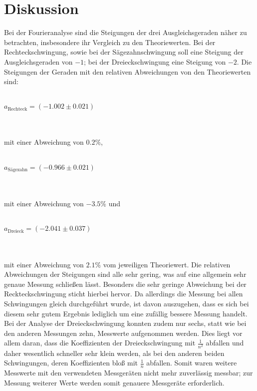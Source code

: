 \section{Diskussion}
\label{sec:Diskussion}
Bei der Fourieranalyse sind die Steigungen der drei Ausgleichsgeraden näher zu betrachten, insbesondere ihr Vergleich zu den 
Theoriewerten. Bei der Rechteckschwingung, sowie bei der Sägezahnschwingung soll eine Steigung der Ausgleichsgeraden von $-1$;
bei der Dreieckschwingung eine Steigung von $-2$. Die Steigungen der Geraden mit den relativen Abweichungen von den Theoriewerten 
sind: 
\\ \\
\centerline{$a_\text{Rechteck} = ( -1.002 \pm 0.021 ) $}
\\ \\
mit einer Abweichung von $0.2\%$,
\\ \\
\centerline{$ a_\text{Sägezahn} = (- 0.966 \pm 0.021)$}
\\ \\
mit einer Abweichung von $-3.5 \% $ und 
\\ \\
\centerline{$a_\text{Dreieck} = (-2.041 \pm 0.037 )$}
\\ \\
mit einer Abweichung von $2.1 \%$ vom  jeweiligen Theoriewert.
Die relativen Abweichungen der Steigungen sind alle sehr gering, was auf eine allgemein sehr genaue Messung schließen lässt.
Besonders die sehr geringe Abweichung bei der Reckteckschwingung sticht hierbei hervor. Da allerdings die Messung bei allen 
Schwingungen gleich durchgeführt wurde, ist davon auszugehen, dass es sich bei diesem sehr gutem Ergebnis lediglich um eine 
zufällig bessere Messung handelt. Bei der Analyse der Dreieckschwingung konnten zudem nur sechs, statt wie bei den anderen 
Messungen zehn, Messwerte aufgenommen werden. Dies liegt vor allem daran, dass die Koeffizienten der Dreieckschwingung mit 
$\frac{1}{n^2}$ abfallen und daher wesentlich schneller sehr klein werden, als bei den anderen beiden Schwingungen, deren 
Koeffizienten bloß mit $\frac{1}{n}$ abfallen. Somit waren weitere Messwerte mit den verwendeten Messgeräten nicht mehr 
zuverlässig messbar; zur Messung weiterer Werte werden somit genauere Messgeräte erforderlich.

